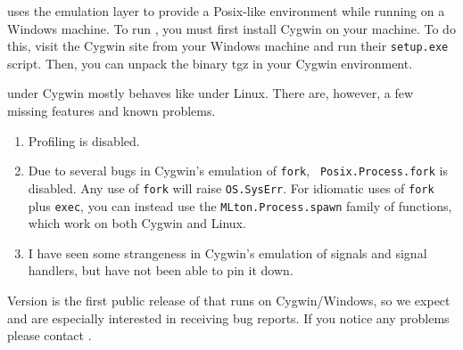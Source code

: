 
{\mlton} uses the  emulation
layer to provide a Posix-like environment while running on a Windows machine.
To run {\mlton}, you must first install Cygwin on your machine.  To do this,
visit the Cygwin site from your Windows machine and run their {\tt setup.exe}
script.  Then, you can unpack the {\mlton} binary tgz in your Cygwin
environment.

{\mlton} under Cygwin mostly behaves like {\mlton} under Linux.  There are,
however, a few missing features and known problems.

\begin{enumerate}

\item Profiling is disabled.

\item Due to several bugs in Cygwin's emulation of {\tt fork}, {\tt
Posix.Process.fork} is disabled.  Any use of {\tt fork} will raise
{\tt OS.SysErr}.  For idiomatic uses of {\tt fork} plus {\tt exec},
you can instead use the {\tt MLton.Process.spawn} family of functions, which
work on both Cygwin and Linux.

\item I have seen some strangeness in Cygwin's emulation of signals and
signal handlers, but have not been able to pin it down.

\end{enumerate}


Version {\version} is the first public release of {\mlton} that runs
on Cygwin/Windows, so we expect and are especially interested in
receiving bug reports.  If you notice any problems please contact {\mltonmail}.


